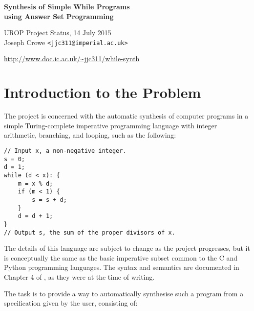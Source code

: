 \documentclass[a4paper,twoside,notitlepage,12pt]{article}
\begin{document}
\begin{titlepage}
\begin{center}
    {\Large \bfseries Synthesis of Simple While Programs \\ using Answer Set Programming}

    {\large UROP Project Status, 14 July 2015} \\[0.5cm]
    
    {\large Joseph Crowe} \texttt{<jjc311@imperial.ac.uk>}
    
    \url{http://www.doc.ic.ac.uk/~jjc311/while-synth}\\[2cm]

    \tableofcontents
\end{center}
\end{titlepage}

\clearpage
\section{Introduction to the Problem}

The project is concerned with the automatic synthesis of computer programs in a simple 
Turing-complete imperative programming language with integer arithmetic, branching, and
looping, such as the following:

\begin{verbatim}
// Input x, a non-negative integer.
s = 0;
d = 1;
while (d < x): {
    m = x % d;
    if (m < 1) {
        s = s + d;
    }
    d = d + 1;
}
// Output s, the sum of the proper divisors of x.
\end{verbatim}

The details of this language are subject to change as the project progresses, but it is 
conceptually the same as the basic imperative subset common to the C and Python 
programming languages. The syntax and semantics are documented in Chapter 4 of 
\cite{final}, as they were at the time of writing.

The task is to provide a way to automatically synthesise such a program from a 
specification given by the user, consisting of:
\end{document}
